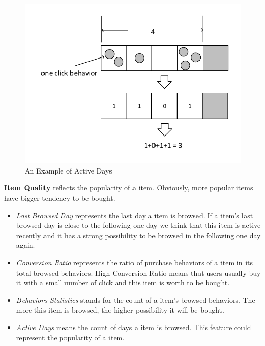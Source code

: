 \documentclass{llncs}
\begin{document}
\begin{itemize}
	\begin{figure}[htbp]
		\centering
		\includegraphics[scale=0.6]{images/active_day.pdf}
		\caption{An Example of Active Days}
		\label{fig:day}
	\end{figure}
	
\end{itemize}

\textbf{Item Quality} reflects the popularity of a item.
Obviously, more popular items have bigger tendency to be bought.
\begin{itemize}
	\item \emph{Last Browsed Day} represents the last day a item is browsed.
	If a item's last browsed day is close to the following one day
	we think that this item is active recently
	and it has a strong possibility to be browsed in the following one day again.
	
	\item \emph{Conversion Ratio} represents the ratio of purchase behaviors of a item
	in its total browsed behaviors. High Conversion Ratio means that users usually buy it
	with a small number of click and this item is worth to be bought.
	
	\item \emph{Behaviors Statistics} stands for the count of a item's browsed behaviors.
	The more this item is browsed, the higher possibility it will be bought.
	
	\item \emph{Active Days} means the count of days a item is browsed.
	This feature could represent the popularity of a item.
\end{itemize}
\end{document}
